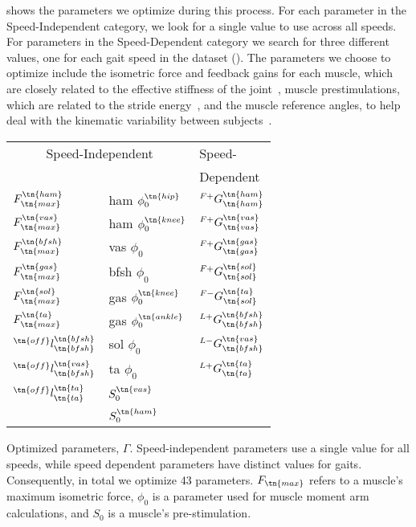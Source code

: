  shows the parameters we optimize during this process.  For
each parameter in the Speed-Independent category, we look for a single value to
use across all speeds. For parameters in the Speed-Dependent category we search
for three different values, one for each gait speed in the dataset
(). The parameters we choose to optimize
include the isometric force and feedback gains for each muscle, which are
closely related to the effective stiffness of the
joint~\citep{geyer2003positive}, muscle prestimulations, which are related to
the stride energy~\citep{geyer2003positive}, and the muscle reference angles, to
help deal with the kinematic variability between
subjects~\citep{geyer2010muscle}.
\begin{margintable}[0in]    
    \centering
    \small
    \begin{tabular}{ll|l}
        \multicolumn{2}{c|}{Speed-Independent} & Speed- \\
                                         &     & Dependent \\
        \midrule
        $F_\tn{max}^\tn{ham}$            & ham $\phi_0^\tn{hip}$   & $^{F+}G_\tn{ham}^\tn{ham}$   \\
        $F_\tn{max}^\tn{vas}$            & ham $\phi_0^\tn{knee}$  & $^{F+}G_\tn{vas}^\tn{vas}$   \\
        $F_\tn{max}^\tn{bfsh}$           & vas $\phi_0$            & $^{F+}G_\tn{gas}^\tn{gas}$   \\
        $F_\tn{max}^\tn{gas}$            & bfsh $\phi_0$           & $^{F+}G_\tn{sol}^\tn{sol}$   \\
        $F_\tn{max}^\tn{sol}$            & gas $\phi_0^\tn{knee}$  & $^{F-}G_\tn{sol}^\tn{ta}$    \\
        $F_\tn{max}^\tn{ta}$             & gas $\phi_0^\tn{ankle}$ & $^{L+}G_\tn{bfsh}^\tn{bfsh}$ \\
        $^\tn{off}l_\tn{bfsh}^\tn{bfsh}$ & sol $\phi_0$            & $^{L-}G_\tn{bfsh}^\tn{vas}$  \\
        $^\tn{off}l_\tn{bfsh}^\tn{vas}$  & ta  $\phi_0$            & $^{L+}G_\tn{ta}^\tn{ta}$     \\
        $^\tn{off}l_\tn{ta}^\tn{ta}$     & $S_0^\tn{vas}$          & \\
                                         & $S_0^\tn{ham}$          & \\
    \end{tabular}
    \caption[Parameters optimized to generate parameter sets for dueling bandits
    optimization]{Optimized parameters, $\Gamma$. Speed-independent parameters
    use a single value for all speeds, while speed dependent parameters have
    distinct values for  gaits. Consequently,
    in total we optimize 43 parameters. $F_\tn{max}$ refers to a muscle's maximum
    isometric force, $\phi_0$ is a parameter used for muscle moment arm
    calculations, and $S_0$ is a muscle's pre-stimulation.}\label{tab:params}
\end{margintable}

